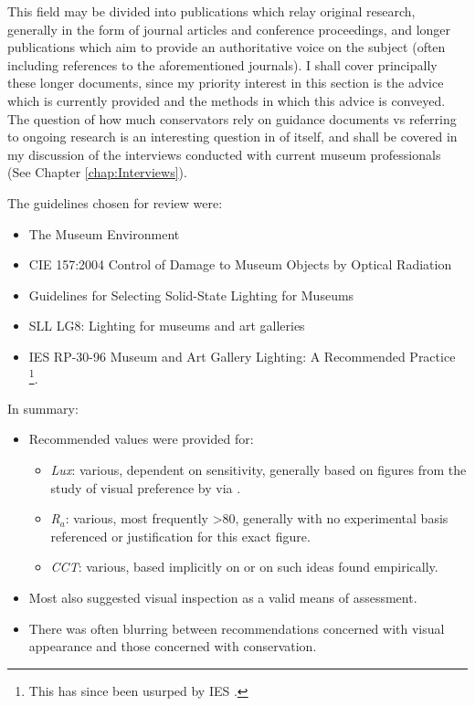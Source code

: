 This field may be divided into publications which relay original research, generally in the form of journal articles and conference proceedings, and longer publications which aim to provide an authoritative voice on the subject (often including references to the aforementioned journals). I shall cover principally these longer documents, since my priority interest in this section is the advice which is currently provided and the methods in which this advice is conveyed. The question of how much conservators rely on guidance documents vs referring to ongoing research is an interesting question in of itself, and shall be covered in my discussion of the interviews conducted with current museum professionals (See Chapter \ref{chap:Interviews}).

\noindent
The guidelines chosen for review were:
\begin{itemize}
\item The Museum Environment \citep{thomson_museum_1986}
\item \gls{CIE} 157:2004 Control of Damage to Museum Objects by Optical Radiation \citep{cie_cie_2004}
\item Guidelines for Selecting Solid-State Lighting for Museums \citep{druzik_guidelines_2012}
\item SLL LG8: Lighting for museums and art galleries \citep{cibse_lighting_2015}
\item IES RP-30-96 Museum and Art Gallery Lighting: A Recommended Practice \citep{ies_ies_1996}\footnote{This has since been usurped by IES \citep{illuminating_engineering_society_ies_2017}.}.
\end{itemize}

\noindent
In summary:
\begin{itemize}
\item Recommended values were provided for:
\begin{itemize}
\item \emph{Lux}: various, dependent on sensitivity, generally based on figures from the study of visual preference by \citet{loe_preferred_1982} via \citet{thomson_museum_1978}.
\item \emph{R$_a$}: various, most frequently \textgreater 80, generally with no experimental basis referenced or justification for this exact figure.
\item \emph{\gls{CCT}}: various, based implicitly on \citet{kruithof_tubular_1941} or on such ideas found empirically.
\end{itemize}
\item Most also suggested visual inspection as a valid means of assessment.
\item There was often blurring between recommendations concerned with visual appearance and those concerned with conservation. 
\end{itemize}

